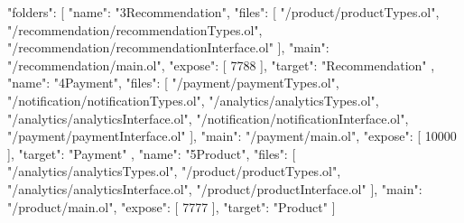 \begin{jsonlisting}[][caption={Build folders representation in JSON used for prototyping}, label={appen_buildjson}]
{
  "folders": [
    {
      "name": "3Recommendation",
      "files": [
        "/product/productTypes.ol",
        "/recommendation/recommendationTypes.ol",
        "/recommendation/recommendationInterface.ol"
      ],
      "main": "/recommendation/main.ol",
      "expose": [
        7788
      ],
      "target": "Recommendation"
    },
    {
      "name": "4Payment",
      "files": [
        "/payment/paymentTypes.ol",
        "/notification/notificationTypes.ol",
        "/analytics/analyticsTypes.ol",
        "/analytics/analyticsInterface.ol",
        "/notification/notificationInterface.ol",
        "/payment/paymentInterface.ol"
      ],
      "main": "/payment/main.ol",
      "expose": [
        10000
      ],
      "target": "Payment"
    },
    {
      "name": "5Product",
      "files": [
        "/analytics/analyticsTypes.ol",
        "/product/productTypes.ol",
        "/analytics/analyticsInterface.ol",
        "/product/productInterface.ol"
      ],
      "main": "/product/main.ol",
      "expose": [
        7777
      ],
      "target": "Product"
    }
  ]
}
\end{jsonlisting}